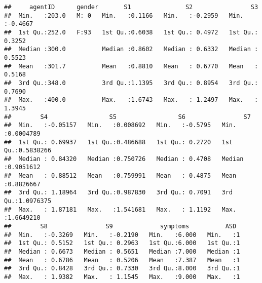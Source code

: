 \documentclass[]{article}
\newenvironment{Shaded}{\begin{snugshade}}{\end{snugshade}}
\newcommand{\KeywordTok}[1]{\textcolor[rgb]{0.13,0.29,0.53}{\textbf{#1}}}
\newcommand{\DecValTok}[1]{\textcolor[rgb]{0.00,0.00,0.81}{#1}}
\newcommand{\StringTok}[1]{\textcolor[rgb]{0.31,0.60,0.02}{#1}}
\newcommand{\CommentTok}[1]{\textcolor[rgb]{0.56,0.35,0.01}{\textit{#1}}}
\newcommand{\OperatorTok}[1]{\textcolor[rgb]{0.81,0.36,0.00}{\textbf{#1}}}
\newcommand{\NormalTok}[1]{#1}
\begin{document}
\begin{verbatim}
##     agentID      gender       S1               S2                S3         
##  Min.   :203.0   M: 0   Min.   :0.1166   Min.   :-0.2959   Min.   :-0.4667  
##  1st Qu.:252.0   F:93   1st Qu.:0.6038   1st Qu.: 0.4972   1st Qu.: 0.3252  
##  Median :300.0          Median :0.8602   Median : 0.6332   Median : 0.5523  
##  Mean   :301.7          Mean   :0.8810   Mean   : 0.6770   Mean   : 0.5168  
##  3rd Qu.:348.0          3rd Qu.:1.1395   3rd Qu.: 0.8954   3rd Qu.: 0.7690  
##  Max.   :400.0          Max.   :1.6743   Max.   : 1.2497   Max.   : 1.3945  
##        S4                 S5                 S6                S7           
##  Min.   :-0.05157   Min.   :0.008692   Min.   :-0.5795   Min.   :0.0004789  
##  1st Qu.: 0.69937   1st Qu.:0.486688   1st Qu.: 0.2720   1st Qu.:0.5838266  
##  Median : 0.84320   Median :0.750726   Median : 0.4708   Median :0.9051612  
##  Mean   : 0.88512   Mean   :0.759991   Mean   : 0.4875   Mean   :0.8826667  
##  3rd Qu.: 1.18964   3rd Qu.:0.987830   3rd Qu.: 0.7091   3rd Qu.:1.0976375  
##  Max.   : 1.87181   Max.   :1.541681   Max.   : 1.1192   Max.   :1.6649210  
##        S8                S9             symptoms          ASD   
##  Min.   :-0.3269   Min.   :-0.2190   Min.   :6.000   Min.   :1  
##  1st Qu.: 0.5152   1st Qu.: 0.2963   1st Qu.:6.000   1st Qu.:1  
##  Median : 0.6673   Median : 0.5651   Median :7.000   Median :1  
##  Mean   : 0.6786   Mean   : 0.5206   Mean   :7.387   Mean   :1  
##  3rd Qu.: 0.8428   3rd Qu.: 0.7330   3rd Qu.:8.000   3rd Qu.:1  
##  Max.   : 1.9382   Max.   : 1.1545   Max.   :9.000   Max.   :1
\end{verbatim}

\begin{Shaded}
\end{Shaded}
\end{document}
